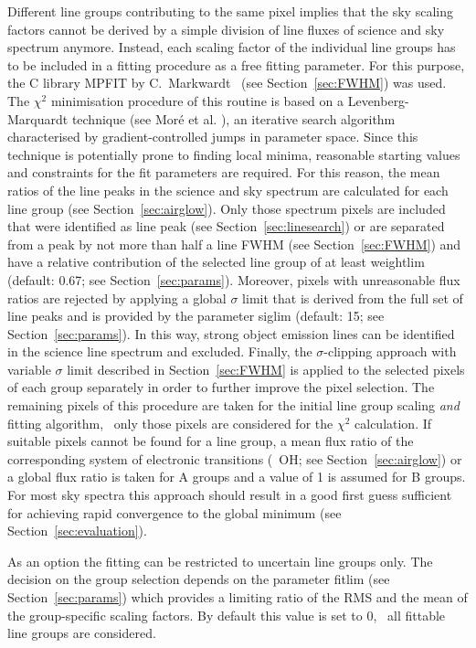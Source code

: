 Different line groups contributing to the same pixel implies that the sky
scaling factors cannot be derived by a simple division of line fluxes of
science and sky spectrum anymore. Instead, each scaling factor of the
individual line groups has to be included in a fitting procedure as a free
fitting parameter. For this purpose, the C library MPFIT by
C.~Markwardt~\cite{CMPFIT} (see Section~\ref{sec:FWHM}) was used. The $\chi^2$
minimisation procedure of this routine is based on a Levenberg-Marquardt
technique (see Mor\'e et al. \cite{MOR80}), an iterative search algorithm
characterised by gradient-controlled jumps in parameter space. Since this
technique is potentially prone to finding local minima, reasonable starting
values and constraints for the fit parameters are required. For this reason,
the mean ratios of the line peaks in the science and sky spectrum are
calculated for each line group (see Section~\ref{sec:airglow}). Only those
spectrum pixels are included that were identified as line peak (see
Section~\ref{sec:linesearch}) or are separated from a peak by not more than
half a line FWHM (see Section~\ref{sec:FWHM}) and have a relative contribution
of the selected line group of at least {\sc weightlim} (default: 0.67; see
Section~\ref{sec:params}). Moreover, pixels with unreasonable flux ratios are
rejected by applying a global $\sigma$ limit that is derived from the full
set of line peaks and is provided by the parameter {\sc siglim} (default: 15;
see Section~\ref{sec:params}). In this way, strong object emission lines can be
identified in the science line spectrum and excluded. Finally, the
$\sigma$-clipping approach with variable $\sigma$ limit described in
Section~\ref{sec:FWHM} is applied to the selected pixels of each group
separately in order to further improve the pixel selection. The remaining
pixels of this procedure are taken for the initial line group scaling {\em and}
fitting algorithm, \ie\ only those pixels are considered for the $\chi^2$
calculation. If suitable pixels cannot be found for a line group, a mean
flux ratio of the corresponding system of electronic transitions (\eg\ OH; see
Section~\ref{sec:airglow}) or a global flux ratio is taken for A groups and a
value of 1 is assumed for B groups. For most sky spectra this approach should
result in a good first guess sufficient for achieving rapid convergence to the
global minimum (see Section~\ref{sec:evaluation}).

As an option the fitting can be restricted to uncertain line groups only. The
decision on the group selection depends on the parameter {\sc fitlim} (see
Section~\ref{sec:params}) which provides a limiting ratio of the RMS and
the mean of the group-specific scaling factors. By default this value is set
to 0, \ie\ all fittable line groups are considered.

